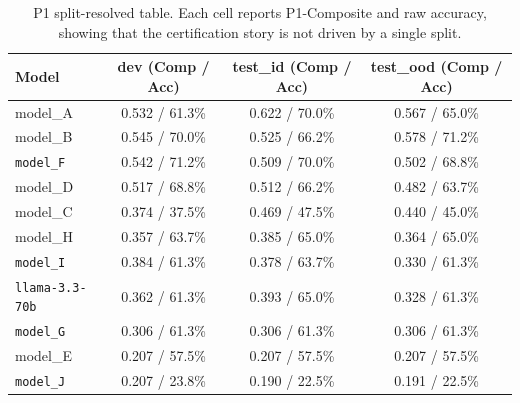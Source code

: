 \begin{table}[t]
\caption{P1 split-resolved table. Each cell reports P1-Composite and raw accuracy, showing that the certification story is not driven by a single split.}
\label{tab:appendix_p1_split}
\centering
\small
\begin{tabular}{lccc}
\toprule
Model & dev (Comp / Acc) & test\_id (Comp / Acc) & test\_ood (Comp / Acc) \\
\midrule
model_A & 0.532 / 61.3\% & 0.622 / 70.0\% & 0.567 / 65.0\% \\
model_B & 0.545 / 70.0\% & 0.525 / 66.2\% & 0.578 / 71.2\% \\
\texttt{model_F} & 0.542 / 71.2\% & 0.509 / 70.0\% & 0.502 / 68.8\% \\
model_D & 0.517 / 68.8\% & 0.512 / 66.2\% & 0.482 / 63.7\% \\
model_C & 0.374 / 37.5\% & 0.469 / 47.5\% & 0.440 / 45.0\% \\
model_H & 0.357 / 63.7\% & 0.385 / 65.0\% & 0.364 / 65.0\% \\
\texttt{model_I} & 0.384 / 61.3\% & 0.378 / 63.7\% & 0.330 / 61.3\% \\
\texttt{llama-3.3-70b} & 0.362 / 61.3\% & 0.393 / 65.0\% & 0.328 / 61.3\% \\
\texttt{model_G} & 0.306 / 61.3\% & 0.306 / 61.3\% & 0.306 / 61.3\% \\
model_E & 0.207 / 57.5\% & 0.207 / 57.5\% & 0.207 / 57.5\% \\
\texttt{model_J} & 0.207 / 23.8\% & 0.190 / 22.5\% & 0.191 / 22.5\% \\
\bottomrule
\end{tabular}
\end{table}

